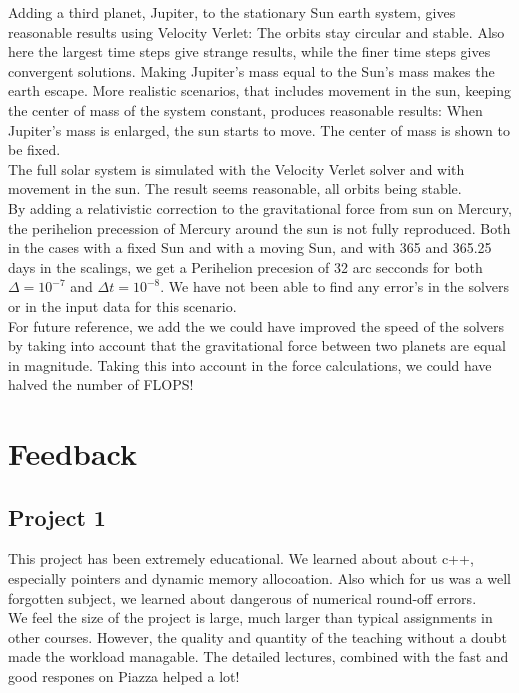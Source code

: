 \documentclass{article}
\begin{document}
Adding a third planet, Jupiter, to the stationary Sun earth system, gives reasonable results using Velocity Verlet: The orbits stay circular and stable. Also here the largest time steps give strange results, while the finer time steps gives convergent solutions. Making Jupiter's mass equal to the Sun's mass makes the earth escape. More realistic scenarios, that includes movement in the sun, keeping the center of mass of the system constant, produces reasonable results: When Jupiter's mass is enlarged, the sun starts to move. The center of mass is shown to be fixed.\\

The full solar system is simulated with the Velocity Verlet solver and with movement in the sun. The result seems reasonable, all orbits being stable.\\

By adding a relativistic correction to the gravitational force from sun on Mercury, the perihelion precession of Mercury around the sun is not fully reproduced. Both in the cases with a fixed Sun and with a moving Sun, and with 365 and 365.25 days in the scalings, we get a Perihelion precesion of 32 arc secconds for both $\Delta = 10^{-7}$ and $\Delta t = 10^{-8}$. We have not been able to find any error's in the solvers or in the input data for this scenario.  \\

For future reference, we add the we could have improved the speed of the solvers by taking into account that the gravitational force between two planets are equal in magnitude. Taking this into account in the force calculations, we could have halved the number of FLOPS!


\section{Feedback}
\subsection{Project 1}
This project has been extremely educational. We learned about about c++, especially pointers and dynamic memory allocoation. Also which for us was a well forgotten subject, we learned about dangerous of numerical round-off errors. \\

We feel the size of the project is large, much larger than typical assignments in other courses. However, the quality and quantity of the teaching without a doubt made the workload managable. The detailed lectures, combined with the fast and good respones on Piazza helped a lot!\\
\end{document}
